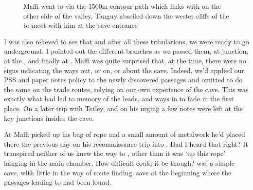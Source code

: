 \begin{figure}[t!]
\checkoddpage \ifoddpage \forcerectofloat \else \forceversofloat \fi
\centering
{}
\caption{Maffi went to  via the 1500m contour path which links  with  on the other side of the valley. Tanguy abseiled down the wester cliffs of the  to meet with him at the cave entrance }
\label{forest}
\end{figure}

I was also relieved to see that  and after all these tribulations, we were ready to go underground. I pointed out the different branches as we passed them, at  junction, at the , and finally at . Maffi was quite surprised that, at the time, there were no signs indicating the ways out, or on, or about the cave. Indeed, we'd applied our PSS and paper notes policy to the newly discovered passages and omitted to do the same on the trade routes, relying on our own experience of the cave. This was exactly what had led to memory of the leads, and ways in  to fade in the first place. On a later trip with Tetley, and on his urging a few notes were left at the key junctions insides the cave.

At  Maffi picked up his bag of rope and a small amount of metalwork he'd placed there the previous day on his reconnaissance trip into . Had I heard that right? It transpired neither of us knew the way to , other than it was `up this rope' hanging in the main chamber. How difficult could it be though?  was a simple cave, with little in the way of route finding, save at the beginning where the passages leading to  had been found.

